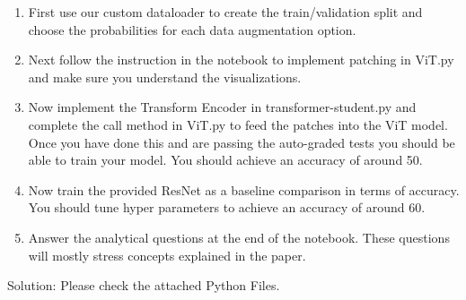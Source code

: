 \documentclass{article}
\begin{document}
\begin{enumerate}[label=(\alph*)]
\color{black}
\item First use our custom dataloader to create the train/validation split and choose the probabilities for each data augmentation option.
\item Next follow the instruction in the notebook to implement patching in ViT.py and make sure you understand the visualizations.
\item Now implement the Transform Encoder in transformer-student.py and complete the call method in ViT.py to feed the patches into the ViT model. Once you have done this and are passing the auto-graded
tests you should be able to train your model. You should achieve an accuracy of around 50.
\item Now train the provided ResNet as a baseline comparison in terms of accuracy. You should tune hyper parameters to achieve an accuracy of around 60.
\item Answer the analytical questions at the end of the notebook. These questions will mostly stress concepts explained in the paper.
\end{enumerate}
\medbreak
\color{blue} Solution: Please check the attached Python Files.
\bigbreak

\color{black}
\end{document}
